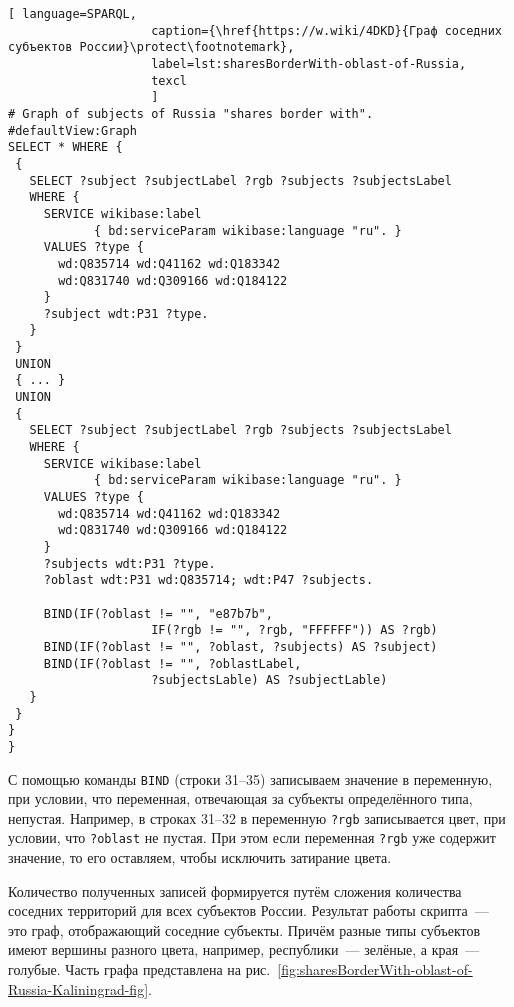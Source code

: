 \lstset{numbers=left, firstnumber=1, frame=single}
\begin{lstlisting}[ language=SPARQL, 
                    caption={\href{https://w.wiki/4DKD}{Граф соседних субъектов России}\protect\footnotemark},
                    label=lst:sharesBorderWith-oblast-of-Russia,
                    texcl 
                    ]
# Graph of subjects of Russia "shares border with". 
#defaultView:Graph
SELECT * WHERE {
 {
   SELECT ?subject ?subjectLabel ?rgb ?subjects ?subjectsLabel 
   WHERE {
     SERVICE wikibase:label 
            { bd:serviceParam wikibase:language "ru". }
     VALUES ?type {
       wd:Q835714 wd:Q41162 wd:Q183342
       wd:Q831740 wd:Q309166 wd:Q184122
     }
     ?subject wdt:P31 ?type.
   }
 }
 UNION
 { ... }
 UNION
 {
   SELECT ?subject ?subjectLabel ?rgb ?subjects ?subjectsLabel 
   WHERE {
     SERVICE wikibase:label 
            { bd:serviceParam wikibase:language "ru". }
     VALUES ?type {
       wd:Q835714 wd:Q41162 wd:Q183342
       wd:Q831740 wd:Q309166 wd:Q184122
     }
     ?subjects wdt:P31 ?type.
     ?oblast wdt:P31 wd:Q835714; wdt:P47 ?subjects.
     
     BIND(IF(?oblast != "", "e87b7b", 
                    IF(?rgb != "", ?rgb, "FFFFFF")) AS ?rgb)
     BIND(IF(?oblast != "", ?oblast, ?subjects) AS ?subject)
     BIND(IF(?oblast != "", ?oblastLabel, 
                    ?subjectsLable) AS ?subjectLable)
   }
 }
}
}
\end{lstlisting}%

С помощью команды \lstinline|BIND| (строки 31--35) 
записываем значение в переменную, при условии, что переменная, 
отвечающая за субъекты определённого типа, непустая. 
Например, в строках 31--32 в переменную \lstinline|?rgb| записывается цвет, 
при условии, что \lstinline|?oblast| не пустая. 
При этом если переменная \lstinline|?rgb| уже содержит значение, 
то его оставляем, чтобы исключить затирание цвета.

Количество полученных записей формируется путём сложения количества соседних территорий для всех субъектов России. Результат работы скрипта~--- это граф, отображающий соседние субъекты. Причём разные типы субъектов имеют вершины разного цвета, например, республики~--- зелёные, а края~--- голубые. Часть графа представлена на рис.~\ref{fig:sharesBorderWith-oblast-of-Russia-Kaliningrad-fig}.

